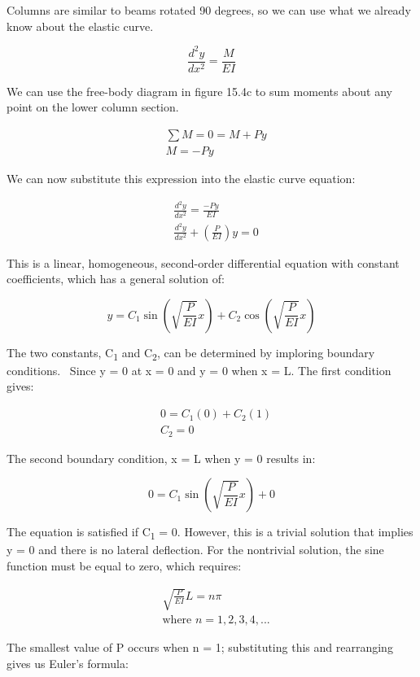 \documentclass[
  letterpaper,
  DIV=11,
  numbers=noendperiod]{scrreprt}
\theoremstyle{definition}
\theoremstyle{remark}
\begin{document}
Columns are similar to beams rotated 90 degrees, so we can use what we
already know about the elastic curve.

\[
\frac{d^2 y}{d x^2}=\frac{M}{E I}
\]

We can use the free-body diagram in figure 15.4c to sum moments about
any point on the lower column section.

\[
\begin{aligned}
& \sum M=0=M+P y \\
& M=-P y
\end{aligned}
\]

We can now substitute this expression into the elastic curve equation:

\[
\begin{aligned}
& \frac{d^2 y}{d x^2}=\frac{-P y}{E I} \\
& \frac{d^2 y}{d x^2}+\left(\frac{P}{E I}\right) y=0
\end{aligned}
\]

This is a linear, homogeneous, second-order differential equation with
constant coefficients, which has a general solution of:

\[
y=C_1 \sin \left(\sqrt{\frac{P}{E I}} x\right)+C_2 \cos \left(\sqrt{\frac{P}{E I}} x\right)
\]

The two constants, C\textsubscript{1} and C\textsubscript{2}, can be
determined by imploring boundary conditions.~ Since y = 0 at x = 0 and y
= 0 when x = L. The first condition gives:

\[
\begin{aligned}
&0  =C_1(0)+C_2(1) \\
& C_2  =0
\end{aligned}
\]

The second boundary condition, x = L when y = 0 results in:

\[
0=C_1 \sin \left(\sqrt{\frac{P}{E I}} x\right)+0
\]

The equation is satisfied if C\textsubscript{1} = 0. However, this is a
trivial solution that implies y = 0 and there is no lateral deflection.
For the nontrivial solution, the sine function must be equal to zero,
which requires:

\[
\begin{aligned}
&\sqrt{\frac{P}{E I}} L=n \pi \\
& \text {where } n=1, 2, 3, 4,...
\end{aligned}
\]

The smallest value of P occurs when n = 1; substituting this and
rearranging gives us Euler's formula:
\end{document}
